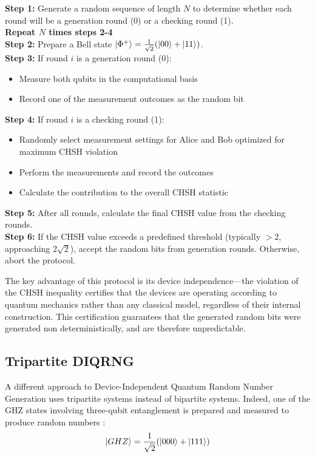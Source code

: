 \documentclass[lettersize,journal]{IEEEtran}
\begin{document}
\begin{tcolorbox}[width=8cm, height=9cm, colback=gray!10, colframe=gray!70, title= Bipartite DIQRNG Protocol]
    \textbf{Step 1:} Generate a random sequence of length $N$ to determine whether each round will be a generation round (0) or a checking round (1).  \\
    \textbf{Repeat $N$ times steps 2-4}\\
    \textbf{Step 2:} Prepare a Bell state $\ket{\Phi^+} = \frac{1}{\sqrt{2}}(\ket{00} + \ket{11})$.\\
    \textbf{Step 3:} If round $i$ is a generation round (0):
    \begin{itemize}
        \item Measure both qubits in the computational basis
        \item Record one of the measurement outcomes as the random bit
    \end{itemize}
    \textbf{Step 4:} If round $i$ is a checking round (1):
    \begin{itemize}
        \item Randomly select measurement settings for Alice and Bob optimized for maximum CHSH violation
        \item Perform the measurements and record the outcomes
        \item Calculate the contribution to the overall CHSH statistic
    \end{itemize}
    \textbf{Step 5:} After all rounds, calculate the final CHSH value from the checking rounds.\\
    \textbf{Step 6:} If the CHSH value exceeds a predefined threshold (typically $>2$, approaching $2\sqrt{2}$), accept the random bits from generation rounds. Otherwise, abort the protocol.
    \label{box:Bipartite DIQRNG Protocol}
\end{tcolorbox}

The key advantage of this protocol is its device independence—the violation of the CHSH inequality certifies that the devices are operating according to quantum mechanics rather than any classical model, regardless of their internal construction. This certification guarantees that the generated random bits were generated non deterministically, and are therefore unpredictable.

\subsection{Tripartite DIQRNG}
A different approach to Device-Independent Quantum Random Number Generation uses tripartite systems instead of bipartite systems. Indeed, one of the GHZ states involving three-qubit entanglement is prepared and measured to produce random numbers : 
\begin{equation}
    \ket{GHZ} = \frac{1}{\sqrt{2}}(\ket{000}+\ket{111}) 
    \label{eq:ghz}
\end{equation}
\end{document}
